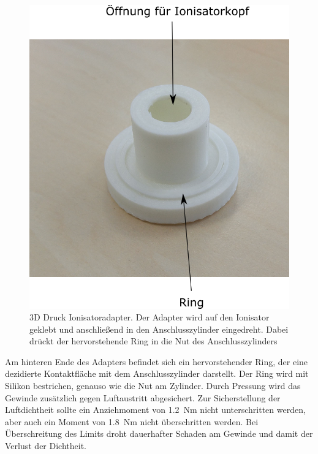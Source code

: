 \begin{figure}[h!]
	\begin{center}
		\includegraphics[scale=0.6]{Adapter_Ionisator.png}
		\caption[Adapter für Ionisator]{3D Druck Ionisatoradapter. Der Adapter wird auf den Ionisator geklebt und anschließend in den Anschlusszylinder eingedreht. Dabei drückt der hervorstehende Ring in die Nut des Anschlusszylinders}
	\end{center}
\end{figure}

Am hinteren Ende des Adapters befindet sich ein hervorstehender Ring, der eine dezidierte Kontaktfläche mit dem Anschlusszylinder darstellt. Der Ring wird mit Silikon bestrichen, genauso wie die Nut am Zylinder. Durch Pressung wird das Gewinde zusätzlich gegen Luftaustritt abgesichert. Zur Sicherstellung der Luftdichtheit sollte ein Anziehmoment von \SI{1,2}{Nm} nicht unterschritten werden, aber auch ein Moment von \SI{1,8}{Nm} nicht überschritten werden. Bei Überschreitung des Limits droht dauerhafter Schaden am Gewinde und damit der Verlust der Dichtheit.


\newpage

